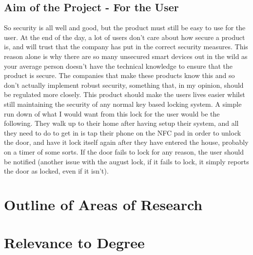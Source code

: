 \subsection{Aim of the Project - For the User}
So security is all well and good, but the product must still be easy to use for the user. At the end of the day, a lot of users don't care about how secure a product is, and will trust that the company has put in the correct security measures. This reason alone is why there are so many unsecured smart devices out in the wild as your average person doesn't have the technical knowledge to ensure that the product is secure. The companies that make these products know this and so don't actually implement robust security, something that, in my opinion, should be regulated more closely. This product should make the users lives easier whilst still maintaining the security of any normal key based locking system.
\newline
\newline
A simple run down of what I would want from this lock for the user would be the following. They walk up to their home after having setup their system, and all they need to do to get in is tap their phone on the NFC pad in order to unlock the door, and have it lock itself again after they have entered the house, probably on a timer of some sorts. If the door fails to lock for any reason, the user should be notified (another issue with the august lock, if it fails to lock, it simply reports the door as locked, even if it isn't).

\section{Outline of Areas of Research}

\section{Relevance to Degree}


